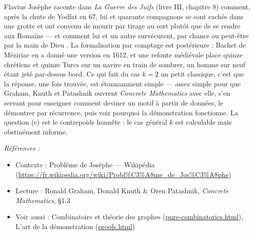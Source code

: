 \documentclass[11pt]{article}
\newenvironment{refs}{\par\small\noindent\emph{Références :}\begin{itemize}\setlength\itemsep{0pt}}{\end{itemize}\normalsize}
\begin{document}
\noindent Flavius Josèphe raconte dans \textit{La Guerre des Juifs} (livre III,
chapitre 8) comment, après la chute de Yodfat en 67, lui et quarante compagnons se sont
cachés dans une grotte et ont convenu de mourir par tirage au sort plutôt que de se rendre
aux Romains --- et comment lui et un autre survécurent, \og{} par chance ou peut-être par la main
de Dieu \fg{}. La formalisation par comptage est postérieure : Bachet de Méziriac en a donné
une version en 1612, et une refonte médiévale place quinze chrétiens et quinze Turcs sur un
navire en train de sombrer, un homme sur neuf étant jeté par-dessus bord. Ce qui fait du cas
$ k=2 $ un petit classique, c'est que la réponse, une fois trouvée, est étonnamment simple
--- assez simple pour que Graham, Knuth et Patashnik ouvrent \textit{Concrete Mathematics} avec
elle, s'en servant pour enseigner comment deviner un motif à partir de données, le démontrer
par récurrence, puis voir pourquoi la démonstration fonctionne. La question (c) est le
contrepoids honnête : le cas général $ k $ est calculable mais obstinément informe.

\begin{refs}
\item Contexte : Problème de Josèphe --- Wikipédia (\url{https://fr.wikipedia.org/wiki/Probl%C3%A8me_de_Jos%C3%A8phe})
\item Lecture : Ronald Graham, Donald Knuth \& Oren Patashnik, \textit{Concrete Mathematics}, \S{}1.3
\item Voir aussi : Combinatoire et théorie des graphes (\url{pure-combinatorics.html}), L'art de la démonstration (\url{proofs.html})
\end{refs}

\bigskip
\end{document}

